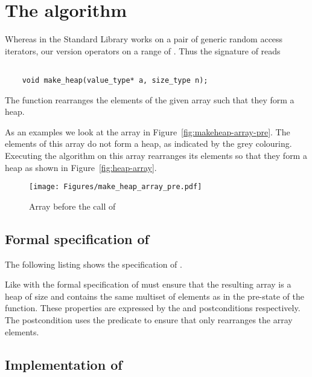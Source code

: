 
\section{The \makeheap algorithm}


Whereas in the \cxx Standard Library \cite[\S 28.7.7.3]{cxx-17-draft}
\makeheap works on a pair of generic random access
iterators,
our version operators on a range of .
Thus the signature of \makeheap reads

\begin{lstlisting}[style = acsl-block]

    void make_heap(value_type* a, size_type n);
\end{lstlisting}

The function \makeheap rearranges the elements of the given
array  such that they form a heap.

As an examples we look at the array in Figure~\ref{fig:makeheap-array-pre}.
The elements of this array do not form a heap, as indicated by the grey colouring.
Executing the \makeheap algorithm on this array rearranges its elements
so that they form a heap as shown in Figure~\ref{fig:heap-array}.

\begin{figure}[hbt]
\centering
\texttt{[image: Figures/make\_heap\_array\_pre.pdf]}
\caption{Array before the call of \makeheap}
\end{figure}


\FloatBarrier

\subsection{Formal specification of \makeheap}

The following listing shows the specification of \makeheap.



Like with \pushheap the formal specification of \makeheap
must ensure that the resulting array is a heap of size 
and contains the same multiset of elements as in the pre-state of the function.
These properties are expressed by the  and 
postconditions respectively.
The  postcondition uses the predicate 
to ensure that \makeheap only rearranges the array elements.

\clearpage

\subsection{Implementation of \makeheap}

